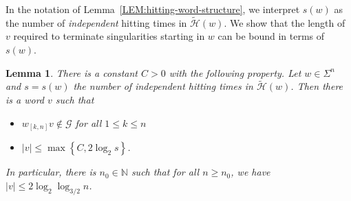 \documentclass[11pt,reqno]{amsart}
\theoremstyle{plain}
\newtheorem{lemma}[theorem]{Lemma}
\theoremstyle{definition}
\newcommand{\N}{{\mathbb N}}
\newcommand{\mc}{\mathcal}
\begin{document}
In the notation of Lemma~\ref{LEM:hitting-word-structure}, we interpret $s(w)$ as the number of \emph{independent} hitting times in $\widetilde{\mc H}(w)$. We show that the length of $v$ required to terminate singularities starting in $w$ can be bound in terms of $s(w)$.

\begin{lemma}
\label{LEM:closing-extension-II}
There is a constant $C>0$ with the following property. Let $w \in \Sigma^n$ and $s = s(w)$ the number of independent hitting times in $\widetilde{\mc H}(w)$. Then there is a word $v$ such that
\begin{itemize}
\item $w_{[k,n]}v \notin \mc G$ for all $1\leqslant k \leqslant n$
\item $|v| \leqslant \max \left\{C, 2 \log_2 s \right\}$.
\end{itemize}
In particular, there is $n_0 \in \N$ such that for all $n \geqslant n_0$, we have $|v| \leqslant 2 \log_2 \log_{3/2} n$.
\end{lemma}
\end{document}
